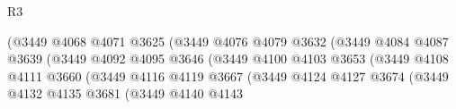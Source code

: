 \begin{lexlean}{R3}
\begin{coremodule}
                                                    (@3449
                                                      @4068
                                                      @4071
                                                      @3625
                                                      (@3449
                                                        @4076
                                                        @4079
                                                        @3632
                                                        (@3449
                                                          @4084
                                                          @4087
                                                          @3639
                                                          (@3449
                                                            @4092
                                                            @4095
                                                            @3646
                                                            (@3449
                                                              @4100
                                                              @4103
                                                              @3653
                                                              (@3449
                                                                @4108
                                                                @4111
                                                                @3660
                                                                (@3449
                                                                  @4116
                                                                  @4119
                                                                  @3667
                                                                  (@3449
                                                                    @4124
                                                                    @4127
                                                                    @3674
                                                                    (@3449
                                                                      @4132
                                                                      @4135
                                                                      @3681
                                                                      (@3449
                                                                        @4140
                                                                        @4143

\end{coremodule}
\end{lexlean}
